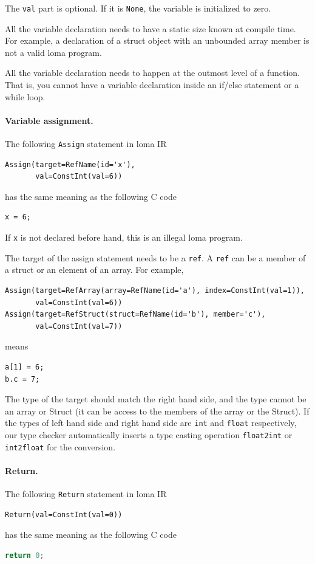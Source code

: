 The \lstinline{val} part is optional. If it is \lstinline{None}, the variable is initialized to zero.

All the variable declaration needs to have a static size known at compile time. For example, a declaration of a struct object with an unbounded array member is not a valid loma program.

All the variable declaration needs to happen at the outmost level of a function. That is, you cannot have a variable declaration inside an if/else statement or a while loop. 

\paragraph{Variable assignment.}
The following \lstinline{Assign} statement in loma IR
\begin{lstlisting}
Assign(target=RefName(id='x'),
       val=ConstInt(val=6))
\end{lstlisting}
has the same meaning as the following C code
\begin{lstlisting}
x = 6;
\end{lstlisting}
If \lstinline{x} is not declared before hand, this is an illegal loma program.

The target of the assign statement needs to be a \lstinline{ref}. A \lstinline{ref} can be a member of a struct or an element of an array. For example,
\begin{lstlisting}
Assign(target=RefArray(array=RefName(id='a'), index=ConstInt(val=1)),
       val=ConstInt(val=6))
Assign(target=RefStruct(struct=RefName(id='b'), member='c'),
       val=ConstInt(val=7))
\end{lstlisting}
means
\begin{lstlisting}
a[1] = 6;
b.c = 7;
\end{lstlisting}

The type of the target should match the right hand side, and the type cannot be an array or Struct (it can be access to the members of the array or the Struct). If the types of left hand side and right hand side are \lstinline{int} and \lstinline{float} respectively, our type checker automatically inserts a type casting operation \lstinline{float2int} or \lstinline{int2float} for the conversion.

\paragraph{Return.}
The following \lstinline{Return} statement in loma IR
\begin{lstlisting}
Return(val=ConstInt(val=0))
\end{lstlisting}
has the same meaning as the following C code
\begin{lstlisting}[language=c]
return 0;
\end{lstlisting}

